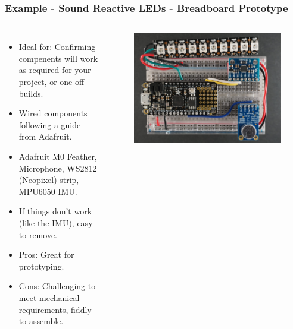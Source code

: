 \documentclass[aspectratio=169, t]{beamer}
\begin{document}
\begin{frame}
\frametitle{Example - Sound Reactive LEDs - Breadboard Prototype}
\vspace{-5mm}
\begin{columns}
	\begin{itemize}
		\item Ideal for: Confirming compenents will work as required for your project, or one off builds.
		\item Wired components following a guide from Adafruit.
		\item Adafruit M0 Feather, Microphone, WS2812 (Neopixel) strip, MPU6050 IMU.
		\item If things don't work (like the IMU), easy to remove.
		\item Pros: Great for prototyping.
		\item Cons: Challenging to meet mechanical requirements, fiddly to assemble.
	\end{itemize}
	\begin{figure}
		\includegraphics[width=\linewidth]{images/breadboard.JPG}
	\end{figure}
\end{columns}
\end{frame}
\end{document}
